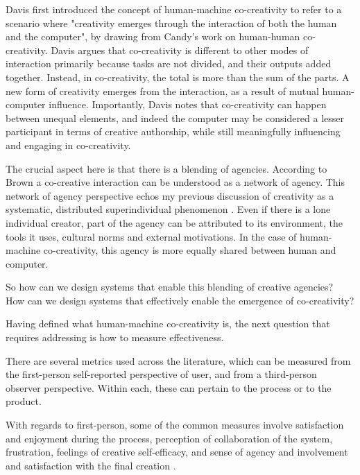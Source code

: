 Davis first introduced the concept of human-machine co-creativity \cite{Davis2013-jy} to refer to a scenario where "creativity emerges through the interaction of both the human and the computer", by drawing from Candy's \cite{Candy2002-ra} work on human-human co-creativity. Davis argues that co-creativity is different to other modes of interaction primarily because tasks are not divided, and their outputs added together. Instead, in co-creativity, the total is more than the sum of the parts. A new form of creativity emerges from the interaction, as a result of mutual human-computer influence. Importantly, Davis notes that co-creativity can happen between unequal elements, and indeed the computer may be considered a lesser participant in terms of creative authorship, while still meaningfully influencing and engaging in co-creativity. 

The crucial aspect here is that there is a blending of agencies. According to Brown \cite{Brown2016-tc} a co-creative interaction can be understood as a network of agency. This network of agency perspective echos my previous discussion of creativity as a systematic, distributed superindividual phenomenon \cite{Bown2012-gg, Schaffer1994-gy, Csikszentmihalyi2015-rq, Csikszentmihalyi2014-cq, Amabile1996-pt, Rhodes1961-od}. Even if there is a lone individual creator, part of the agency can be attributed to its environment, the tools it uses, cultural norms and external motivations. In the case of human-machine co-creativity, this agency is more equally shared between human and computer. 

So how can we design systems that enable this blending of creative agencies? How can we design systems that effectively enable the emergence of co-creativity?

Having defined what human-machine co-creativity is, the next question that requires addressing is how to measure effectiveness. 

There are several metrics used across the literature, which can be measured from the first-person self-reported perspective of user, and from a third-person observer perspective. Within each, these can pertain to the process or to the product. 

With regards to first-person, some of the common measures involve satisfaction and enjoyment during the process, perception of collaboration of the system, frustration, feelings of creative self-efficacy, and sense of agency and involvement and satisfaction with the final creation \cite{Rezwana2022-ui, Rezwana2023-gj, Lawton2023-tb}. 

